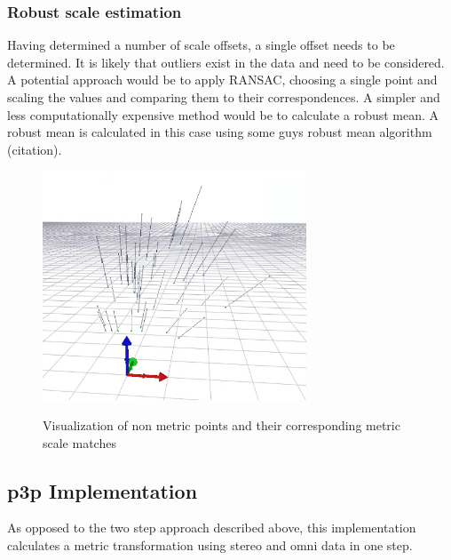 

\subsubsection{Robust scale estimation}

Having determined a number of scale offsets, a single offset needs to be determined.  It is likely that outliers exist in the data and need to be considered.  A potential approach would be to apply RANSAC, choosing a single point and scaling the values and comparing them to their correspondences.  A simpler and less computationally expensive method would be to calculate a robust mean.  A robust mean is calculated in this case using some guys robust mean algorithm (citation).


\begin{figure}[H]
  \centering
    \includegraphics[width=0.7\textwidth]{chapters/images/scale_matches}\\
  \caption{Visualization of non metric points and their corresponding metric scale matches}
  \label{fig:circular_match}
\end{figure}

\subsection{p3p Implementation}

As opposed to the two step approach described above, this implementation calculates a metric transformation using stereo and omni data in one step.

